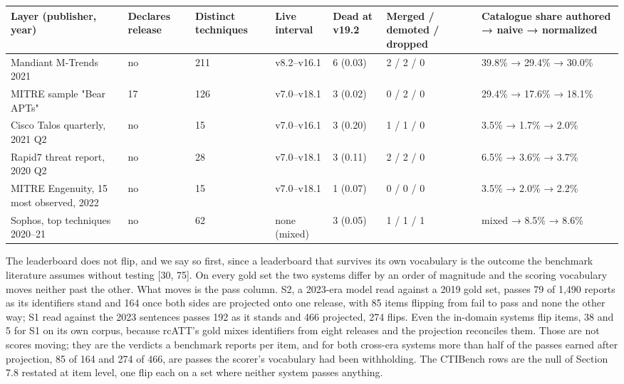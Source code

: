 \documentclass[11pt,a4paper]{article}
\begin{document}
\begin{center}\footnotesize
\begin{tabular}{lllllll}
\toprule
Layer (publisher, year) & Declares release & Distinct techniques & Live interval & Dead at v19.2 & Merged / demoted / dropped & Catalogue share authored → naive → normalized \\
\midrule
Mandiant M-Trends 2021 & no & 211 & v8.2–v16.1 & 6 (0.03) & 2 / 2 / 0 & 39.8\% → 29.4\% → 30.0\% \\
MITRE sample "Bear APTs" & 17 & 126 & v7.0–v18.1 & 3 (0.02) & 0 / 2 / 0 & 29.4\% → 17.6\% → 18.1\% \\
Cisco Talos quarterly, 2021 Q2 & no & 15 & v7.0–v16.1 & 3 (0.20) & 1 / 1 / 0 & 3.5\% → 1.7\% → 2.0\% \\
Rapid7 threat report, 2020 Q2 & no & 28 & v7.0–v18.1 & 3 (0.11) & 2 / 2 / 0 & 6.5\% → 3.6\% → 3.7\% \\
MITRE Engenuity, 15 most observed, 2022 & no & 15 & v7.0–v18.1 & 1 (0.07) & 0 / 0 / 0 & 3.5\% → 2.0\% → 2.2\% \\
Sophos, top techniques 2020–21 & no & 62 & none (mixed) & 3 (0.05) & 1 / 1 / 1 & mixed → 8.5\% → 8.6\% \\
\bottomrule
\end{tabular}
\end{center}

The leaderboard does not flip, and we say so first, since a leaderboard that survives its own vocabulary is the outcome the benchmark literature assumes without testing [30, 75]. On every gold set the two systems differ by an order of magnitude and the scoring vocabulary moves neither past the other. What moves is the pass column. S2, a 2023-era model read against a 2019 gold set, passes 79 of 1,490 reports as its identifiers stand and 164 once both sides are projected onto one release, with 85 items flipping from fail to pass and none the other way; S1 read against the 2023 sentences passes 192 as it stands and 466 projected, 274 flips. Even the in-domain systems flip items, 38 and 5 for S1 on its own corpus, because rcATT's gold mixes identifiers from eight releases and the projection reconciles them. Those are not scores moving; they are the verdicts a benchmark reports per item, and for both cross-era systems more than half of the passes earned after projection, 85 of 164 and 274 of 466, are passes the scorer's vocabulary had been withholding. The CTIBench rows are the null of Section 7.8 restated at item level, one flip each on a set where neither system passes anything.
\end{document}
